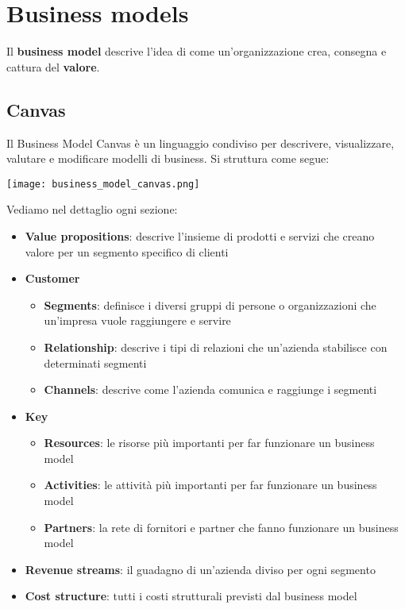 \newpage
\section{Business models}
Il \textbf{business model} descrive l'idea di come un'organizzazione crea, consegna e cattura del \textbf{valore}.
\subsection{Canvas}
Il Business Model Canvas è un linguaggio condiviso per descrivere, visualizzare, valutare e modificare modelli di business. Si struttura come segue:
\begin{center}
	\texttt{[image: business\_model\_canvas.png]}
\end{center}
Vediamo nel dettaglio ogni sezione:
\begin{itemize}
	\item \textbf{Value propositions}: descrive l'insieme di prodotti e servizi che creano valore per un segmento specifico di clienti
	\item \textbf{Customer}
	\begin{itemize}
		\item \textbf{Segments}: definisce i diversi gruppi di persone o organizzazioni che un'impresa vuole raggiungere e servire
		\item \textbf{Relationship}: descrive i tipi di relazioni che un'azienda stabilisce con determinati segmenti
		\item \textbf{Channels}: descrive come l'azienda comunica e raggiunge i segmenti
	\end{itemize}
	\item \textbf{Key}
	\begin{itemize}
		\item \textbf{Resources}: le risorse più importanti per far funzionare un business model
		\item \textbf{Activities}: le attività più importanti per far funzionare un business model
		\item \textbf{Partners}: la rete di fornitori e partner che fanno funzionare un business model
	\end{itemize}
	\item \textbf{Revenue streams}: il guadagno di un'azienda diviso per ogni segmento
	\item \textbf{Cost structure}: tutti i costi strutturali previsti dal business model
\end{itemize}

